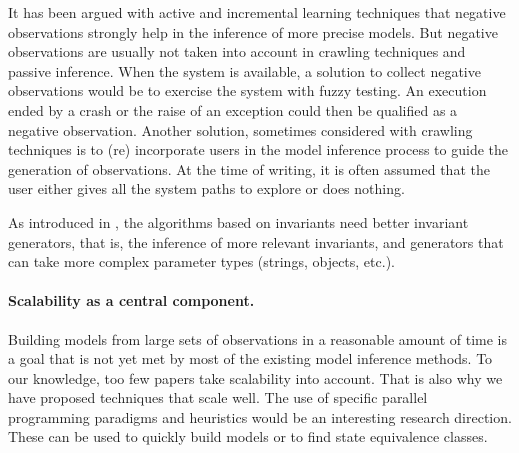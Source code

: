 It has been argued with active and incremental learning
techniques that negative observations strongly help in the
inference of more precise models. But negative observations are
usually not taken into account in crawling techniques and passive
inference. When the system is available, a solution to collect
negative observations would be to exercise the system with fuzzy
testing. An execution ended by a crash or the raise of an
exception could then be qualified as a negative observation.
Another solution, sometimes considered with crawling techniques
is to (re) incorporate users in the model inference process to
guide the generation of observations. At the time of writing, it
is often assumed that the user either gives all the system paths
to explore or does nothing.

As introduced in \cite{Ernst200735}, the algorithms based on
invariants need better invariant generators, that is, the
inference of more relevant invariants, and generators that can
take more complex parameter types (strings, objects, etc.).

\paragraph{Scalability as a central component.} Building models
from large sets of observations in a reasonable amount of time is
a goal that is not yet met by most of the existing model
inference methods. To our knowledge, too few papers
\cite{Yang:2006:PMT:1134285.1134325,Pradel:2009} take scalability
into account. That is also why we have proposed techniques that
scale well. The use of specific parallel programming paradigms
and heuristics would be an interesting research direction. These
can be used to quickly build models or to find state equivalence
classes.


